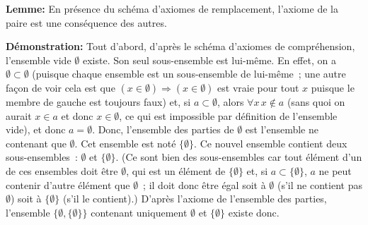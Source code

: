    \done 


\medskip

\noindent\textbf{Lemme:} En présence du schéma d'axiomes de remplacement, l'axiome de la paire est une conséquence des autres. 

\medskip

\noindent\textbf{Démonstration:} Tout d'abord, d'après le schéma d'axiomes de compréhension, l'ensemble vide $\emptyset$ existe. 
Son seul sous-ensemble est lui-même. 
En effet, on a $\emptyset \subset \emptyset$ (puisque chaque ensemble est un sous-ensemble de lui-même ; une autre façon de voir cela est que $(x \in \emptyset) \Rightarrow (x \in \emptyset)$ est vraie pour tout $x$ puisque le membre de gauche est toujours faux) et, si $a \subset \emptyset$, alors $\forall x \, x \notin a$ (sans quoi on aurait $x \in a$ et donc $x \in \emptyset$, ce qui est impossible par définition de l'ensemble vide), et donc $a = \emptyset$. 
Donc, l'ensemble des parties de $\emptyset$ est l'ensemble ne contenant que $\emptyset$. 
Cet ensemble est noté $\lbrace \emptyset \rbrace$. 
Ce nouvel ensemble contient deux sous-ensembles : $\emptyset$ et $\lbrace \emptyset \rbrace$. 
(Ce sont bien des sous-ensembles car tout élément d'un de ces ensembles doit être $\emptyset$, qui est un élément de $\lbrace \emptyset \rbrace$ et, si $a \subset \lbrace \emptyset \rbrace$, $a$ ne peut contenir d'autre élément que $\emptyset$ ; il doit donc être égal soit à $\emptyset$ (s'il ne contient pas $\emptyset$) soit à $\lbrace \emptyset \rbrace$ (s'il le contient).) 
D'après l'axiome de l'ensemble des parties, l'ensemble $\lbrace \emptyset, \lbrace \emptyset \rbrace \rbrace$ contenant uniquement $\emptyset$ et $\lbrace \emptyset \rbrace$ existe donc. 

